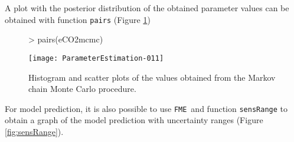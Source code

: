 \documentclass[a4paper]{article}
\newcommand{\FME}{\texttt{FME}}
\begin{document}
A plot with the posterior distribution of the obtained parameter values can be obtained with function {\tt pairs} (Figure \ref{fig:mcmc})

\begin{figure}
  \centering
\begin{Schunk}
\begin{Sinput}
> pairs(eCO2mcmc)
\end{Sinput}
\end{Schunk}
\texttt{[image: ParameterEstimation-011]}
  \caption{Histogram and scatter plots of the values obtained from the Markov chain Monte Carlo procedure.}
  \label{fig:mcmc}
\end{figure}

For model prediction, it is also possible to use \FME \, and function {\tt sensRange} to obtain a graph of the model prediction with uncertainty ranges (Figure \ref{fig:sensRange}).
\end{document}
